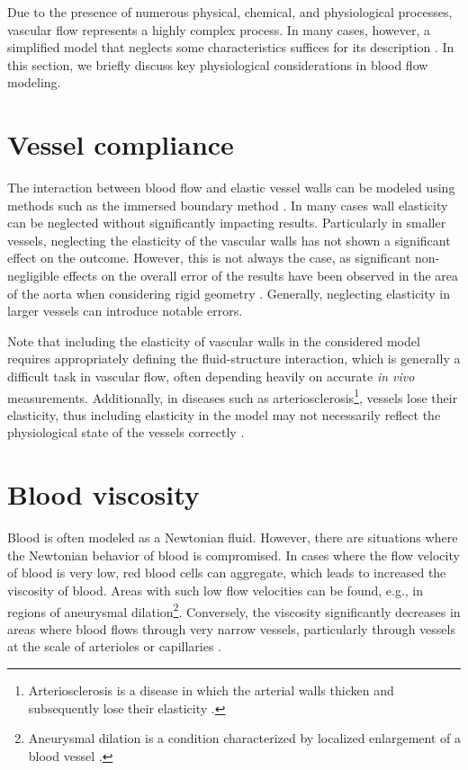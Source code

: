 Due to the presence of numerous physical, chemical, and physiological processes, vascular flow represents a highly complex process. In many cases, however, a simplified model that neglects some characteristics suffices for its description \cite{Saloner2019}. In this section, we briefly discuss key physiological considerations in blood flow modeling.

\section*{\fontsize{11}{15}\selectfont Vessel compliance}
The interaction between blood flow and elastic vessel walls can be modeled using methods such as the immersed boundary method \cite{Peskin}. In many cases wall elasticity can be neglected without significantly impacting results. Particularly in smaller vessels, neglecting the elasticity of the vascular walls has not shown a significant effect on the outcome. \cite{DempereMarco2006} However, this is not always the case, as significant non-negligible effects on the overall error of the results have been observed in the area of the aorta when considering rigid geometry \cite{LANTZ2011}. Generally, neglecting elasticity in larger vessels can introduce notable errors.

Note that including the elasticity of vascular walls in the considered model requires appropriately defining the  fluid-structure interaction, which is generally a difficult task in vascular flow, often depending heavily on accurate \textit{in vivo} measurements. Additionally, in diseases such as arteriosclerosis\footnote{Arteriosclerosis is a disease in which the arterial walls thicken and subsequently lose their elasticity \cite{Fishbein2015}.}, vessels lose their elasticity, thus including elasticity in the model may not necessarily reflect the physiological state of the vessels correctly \cite{Saloner2019}.

\section*{\fontsize{11}{15}\selectfont Blood viscosity}
Blood is often modeled as a Newtonian fluid. However, there are situations where the Newtonian behavior of blood is compromised. In cases where the flow velocity of blood is very low, red blood cells can aggregate, which leads to increased the viscosity of blood. Areas with such low flow velocities can be found, e.g., in regions of aneurysmal dilation\footnote{Aneurysmal dilation is a condition characterized by localized enlargement of a blood vessel \cite{Syed1997}.}. Conversely, the viscosity significantly decreases in areas where blood flows through very narrow vessels, particularly through vessels at the scale of arterioles or capillaries \cite{Saloner2019}.


